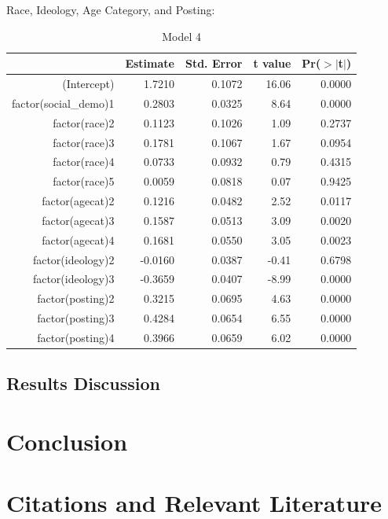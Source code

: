 \documentclass[
]{article}
\begin{document}
Race, Ideology, Age Category, and Posting:

\begin{table}[ht]
\centering
\caption{Model 4} 
\begin{tabular}{rrrrr}
  \hline
 & Estimate & Std. Error & t value & Pr($>$$|$t$|$) \\ 
  \hline
(Intercept) & 1.7210 & 0.1072 & 16.06 & 0.0000 \\ 
  factor(social\_demo)1 & 0.2803 & 0.0325 & 8.64 & 0.0000 \\ 
  factor(race)2 & 0.1123 & 0.1026 & 1.09 & 0.2737 \\ 
  factor(race)3 & 0.1781 & 0.1067 & 1.67 & 0.0954 \\ 
  factor(race)4 & 0.0733 & 0.0932 & 0.79 & 0.4315 \\ 
  factor(race)5 & 0.0059 & 0.0818 & 0.07 & 0.9425 \\ 
  factor(agecat)2 & 0.1216 & 0.0482 & 2.52 & 0.0117 \\ 
  factor(agecat)3 & 0.1587 & 0.0513 & 3.09 & 0.0020 \\ 
  factor(agecat)4 & 0.1681 & 0.0550 & 3.05 & 0.0023 \\ 
  factor(ideology)2 & -0.0160 & 0.0387 & -0.41 & 0.6798 \\ 
  factor(ideology)3 & -0.3659 & 0.0407 & -8.99 & 0.0000 \\ 
  factor(posting)2 & 0.3215 & 0.0695 & 4.63 & 0.0000 \\ 
  factor(posting)3 & 0.4284 & 0.0654 & 6.55 & 0.0000 \\ 
  factor(posting)4 & 0.3966 & 0.0659 & 6.02 & 0.0000 \\ 
   \hline
\end{tabular}
\end{table}

\hypertarget{results-discussion}{%
\subsection{Results Discussion}\label{results-discussion}}

\hypertarget{conclusion}{%
\section{Conclusion}\label{conclusion}}

\hypertarget{citations-and-relevant-literature}{%
\section{Citations and Relevant
Literature}\label{citations-and-relevant-literature}}
\end{document}
